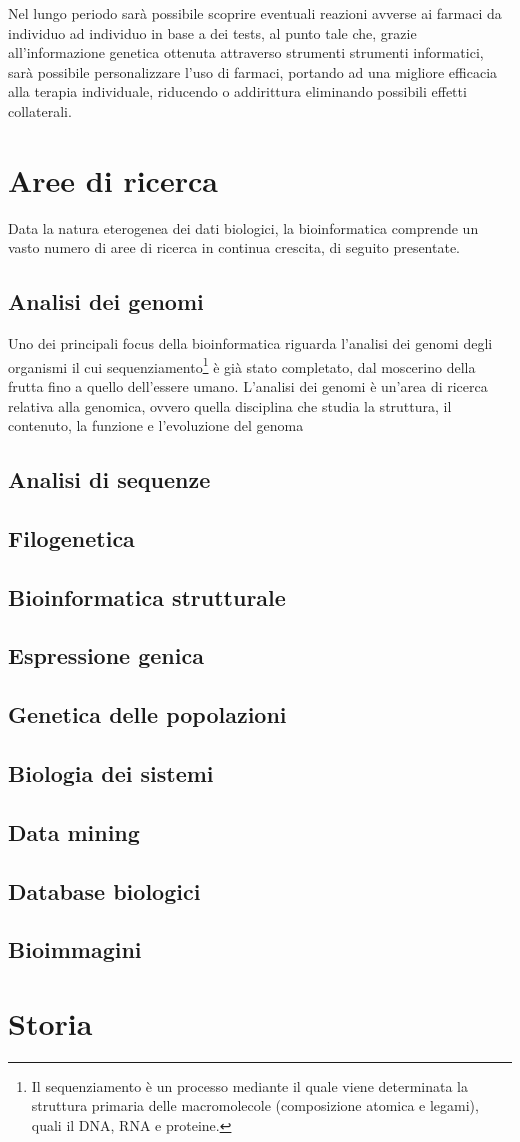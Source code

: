 \newline
Nel lungo periodo sarà possibile scoprire eventuali reazioni avverse ai farmaci da individuo ad individuo in base a dei tests, al punto tale che, grazie all'informazione genetica ottenuta attraverso strumenti strumenti informatici, sarà possibile personalizzare l'uso di farmaci, portando ad una migliore efficacia alla terapia individuale, riducendo o addirittura eliminando possibili effetti collaterali.

\section{Aree di ricerca}
Data la natura eterogenea dei dati biologici, la bioinformatica comprende un vasto numero di aree di ricerca in continua crescita, di seguito presentate.
\subsection{Analisi dei genomi}
Uno dei principali focus della bioinformatica riguarda l'analisi dei genomi degli organismi il cui sequenziamento\footnote{Il sequenziamento è un processo mediante il quale viene determinata la struttura primaria delle macromolecole (composizione atomica e legami), quali il DNA, RNA e proteine.} è già stato completato, dal moscerino della frutta fino a quello dell'essere umano. L'analisi dei genomi è un'area di ricerca relativa alla genomica, ovvero quella disciplina che studia la struttura, il contenuto, la funzione e l'evoluzione del genoma
\subsection{Analisi di sequenze}
\subsection{Filogenetica}
\subsection{Bioinformatica strutturale}
\subsection{Espressione genica}
\subsection{Genetica delle popolazioni}
\subsection{Biologia dei sistemi}
\subsection{Data mining}
\subsection{Database biologici} %
\subsection{Bioimmagini}



\section{Storia}
